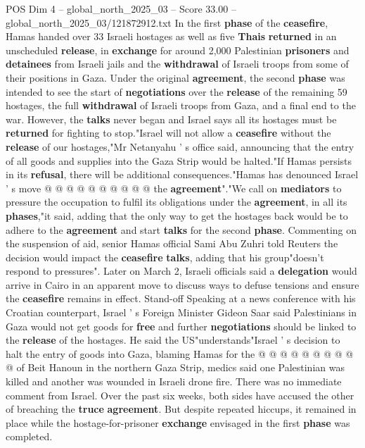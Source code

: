 \begin{textsample}{POS Dim 4 – global\_north\_2025\_03 – Score 33.00 – global\_north\_2025\_03/121872912.txt}
In the first \textbf{phase} of the \textbf{ceasefire}, Hamas handed over 33 Israeli hostages as well as five \textbf{Thais} \textbf{returned} in an unscheduled \textbf{release}, in \textbf{exchange} for around 2,000 Palestinian \textbf{prisoners} and \textbf{detainees} from Israeli jails and the \textbf{withdrawal} of Israeli troops from some of their positions in Gaza.
Under the original \textbf{agreement}, the second \textbf{phase} was intended to see the start of \textbf{negotiations} over the \textbf{release} of the remaining 59 hostages, the full \textbf{withdrawal} of Israeli troops from Gaza, and a final end to the war.
However, the \textbf{talks} never began and Israel says all its hostages must be \textbf{returned} for fighting to stop."Israel will not allow a \textbf{ceasefire} without the \textbf{release} of our hostages,"Mr Netanyahu ' s office said, announcing that the entry of all goods and supplies into the Gaza Strip would be halted."If Hamas persists in its \textbf{refusal}, there will be additional consequences."Hamas has denounced Israel ' s move @ @ @ @ @ @ @ @ @ @ the \textbf{agreement}"."We call on \textbf{mediators} to pressure the occupation to fulfil its obligations under the \textbf{agreement}, in all its \textbf{phases},"it said, adding that the only way to get the hostages back would be to adhere to the \textbf{agreement} and start \textbf{talks} for the second \textbf{phase}.
Commenting on the suspension of aid, senior Hamas official Sami Abu Zuhri told Reuters the decision would impact the \textbf{ceasefire} \textbf{talks}, adding that his group"doesn't respond to pressures".
Later on March 2, Israeli officials said a \textbf{delegation} would arrive in Cairo in an apparent move to discuss ways to defuse tensions and ensure the \textbf{ceasefire} remains in effect.
Stand-off Speaking at a news conference with his Croatian counterpart, Israel ' s Foreign Minister Gideon Saar said Palestinians in Gaza would not get goods for \textbf{free} and further \textbf{negotiations} should be linked to the \textbf{release} of the hostages.
He said the US"understands"Israel ' s decision to halt the entry of goods into Gaza, blaming Hamas for the @ @ @ @ @ @ @ @ @ @ of Beit Hanoun in the northern Gaza Strip, medics said one Palestinian was killed and another was wounded in Israeli drone fire.
There was no immediate comment from Israel.
Over the past six weeks, both sides have accused the other of breaching the \textbf{truce} \textbf{agreement}.
But despite repeated hiccups, it remained in place while the hostage-for-prisoner \textbf{exchange} envisaged in the first \textbf{phase} was completed.

\end{textsample}
